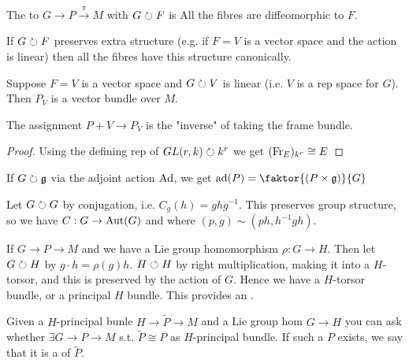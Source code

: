 \documentclass{article}
\begin{document}
\begin{definition}
The  to $G \to P \overset{\pi}{\to} M$ with $G \circlearrowright F$ is 
All the fibres are diffeomorphic to $F$. 
\end{definition}

If $G \circlearrowright F$ preserves extra structure (e.g. if $F=V$ is a vector space and the action is linear) then all the fibres have this structure canonically. 

\begin{example}
Suppose $F=V$ is a vector space and $G \circlearrowright V$ is linear (i.e. $V$ is a rep space for $G$). Then $P_V$ is a vector bundle over $M$. 
\end{example}

\begin{prop}
The assignment $P+V \to P_V$ is the "inverse" of taking the frame bundle.  
\end{prop}
\begin{proof}
Using the defining rep of $GL(r,k) \circlearrowright k^r$ we get $(\operatorname{Fr}_E)_{k^r} \cong E$
\end{proof}

\begin{example}
If $G \circlearrowright \mathfrak{g}$ via the adjoint action $\operatorname{Ad}$, we get $\ad(P) = \faktor{(P \times \mf{g})}{G}$
\end{example}

\begin{example}
Let $G \circlearrowright G$ by conjugation, i.e. $C_g(h) = ghg^{-1}$. This preserves group structure, so we have $C : G \to \operatorname{Aut}(G)$ and 
where $(p,g) \sim (ph,h^{-1}gh)$.
\end{example}

\begin{example}
If $G \to P \to M$ and we have a Lie group homomorphism $\rho : G \to H$. Then let $G \circlearrowright H$ by $g \cdot h = \rho(g)h$. $H \circlearrowleft H$ by right multiplication, making it into a $H$-torsor, and this is preserved by the action of $G$. Hence we have 
a $H$-torsor bundle, or a principal $H$ bundle. This provides an . 
\end{example}

Given a $H$-principal bunle $H \to \tilde{P} \to M$ and a Lie group hom $G \to H$ you can ask whether $\exists G \to P \to M$ s.t.  $\tilde{P} \cong P$ as $H$-principal bundle. If such a $P$ exists, we say that it is a  of $\tilde{P}$. 
\end{document}
